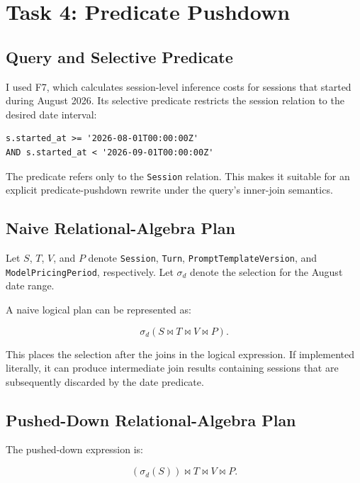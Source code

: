 \documentclass[11pt,a4paper]{article}
\begin{document}
\section{Task 4: Predicate Pushdown}

\subsection{Query and Selective Predicate}

I used F7, which calculates session-level inference costs for
sessions that started during August 2026. Its selective predicate
restricts the session relation to the desired date interval:

\begin{lstlisting}[style=sqlstyle]
s.started_at >= '2026-08-01T00:00:00Z'
AND s.started_at < '2026-09-01T00:00:00Z'
\end{lstlisting}

The predicate refers only to the \texttt{Session} relation. This
makes it suitable for an explicit predicate-pushdown rewrite
under the query's inner-join semantics.

\subsection{Naive Relational-Algebra Plan}

Let \(S\), \(T\), \(V\), and \(P\) denote \texttt{Session},
\texttt{Turn}, \texttt{PromptTemplateVersion}, and
\texttt{ModelPricingPeriod}, respectively. Let \(\sigma_d\)
denote the selection for the August date range.

A naive logical plan can be represented as:

\[
\sigma_d(S \bowtie T \bowtie V \bowtie P).
\]

This places the selection after the joins in the logical expression.
If implemented literally, it can produce intermediate join results
containing sessions that are subsequently discarded by the date
predicate.

\subsection{Pushed-Down Relational-Algebra Plan}

The pushed-down expression is:

\[
(\sigma_d(S)) \bowtie T \bowtie V \bowtie P.
\]
\end{document}
